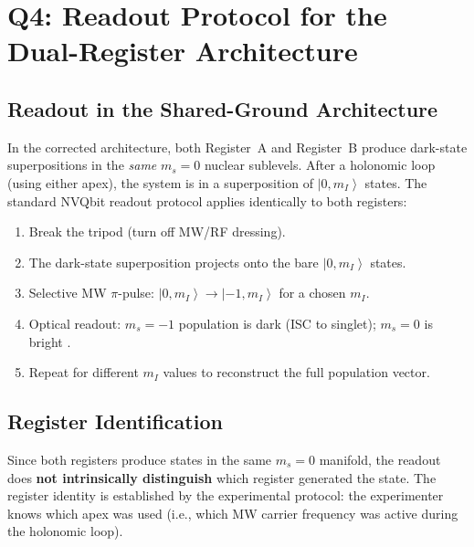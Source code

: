 \documentclass[11pt,letterpaper]{article}
\newcommand{\ket}[1]{\left|#1\right\rangle}
\begin{document}
\section{Q4: Readout Protocol for the Dual-Register Architecture}
\label{sec:q4}

\subsection{Readout in the Shared-Ground Architecture}

In the corrected architecture, both Register~A and Register~B produce dark-state superpositions in the \emph{same} $m_s = 0$ nuclear sublevels. After a holonomic loop (using either apex), the system is in a superposition of $\ket{0, m_I}$ states. The standard NVQbit readout protocol \cite{Biswas2026} applies identically to both registers:
\begin{enumerate}[leftmargin=*]
    \item Break the tripod (turn off MW/RF dressing).
    \item The dark-state superposition projects onto the bare $\ket{0, m_I}$ states.
    \item Selective MW $\pi$-pulse: $\ket{0, m_I} \to \ket{-1, m_I}$ for a chosen $m_I$.
    \item Optical readout: $m_s = -1$ population is dark (ISC to singlet); $m_s = 0$ is bright \cite{Doherty2013}. %
    \item Repeat for different $m_I$ values to reconstruct the full population vector.
\end{enumerate}

\subsection{Register Identification}

Since both registers produce states in the same $m_s = 0$ manifold, the readout does \textbf{not intrinsically distinguish} which register generated the state. The register identity is established by the experimental protocol: the experimenter knows which apex was used (i.e., which MW carrier frequency was active during the holonomic loop).
\end{document}
